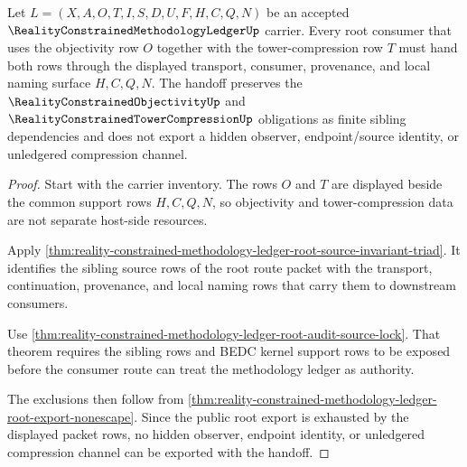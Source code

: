 \begin{theorem}
\label{thm:reality-constrained-methodology-ledger-objectivity-tower-compression-handoff}
Let $L=(X,A,O,T,I,S,D,U,F,H,C,Q,N)$ be an accepted $\RealityConstrainedMethodologyLedgerUp$ carrier. Every root consumer that uses the objectivity row $O$ together with the tower-compression row $T$ must hand both rows through the displayed transport, consumer, provenance, and local naming surface $H,C,Q,N$. The handoff preserves the $\RealityConstrainedObjectivityUp$ and $\RealityConstrainedTowerCompressionUp$ obligations as finite sibling dependencies and does not export a hidden observer, endpoint/source identity, or unledgered compression channel.
\end{theorem}
\begin{proof}
Start with the carrier inventory. The rows $O$ and $T$ are displayed beside the common support rows $H,C,Q,N$, so objectivity and tower-compression data are not separate host-side resources.

Apply \autoref{thm:reality-constrained-methodology-ledger-root-source-invariant-triad}. It identifies the sibling source rows of the root route packet with the transport, continuation, provenance, and local naming rows that carry them to downstream consumers.

Use \autoref{thm:reality-constrained-methodology-ledger-root-audit-source-lock}. That theorem requires the sibling rows and BEDC kernel support rows to be exposed before the consumer route can treat the methodology ledger as authority.

The exclusions then follow from \autoref{thm:reality-constrained-methodology-ledger-root-export-nonescape}. Since the public root export is exhausted by the displayed packet rows, no hidden observer, endpoint identity, or unledgered compression channel can be exported with the handoff.
\end{proof}

